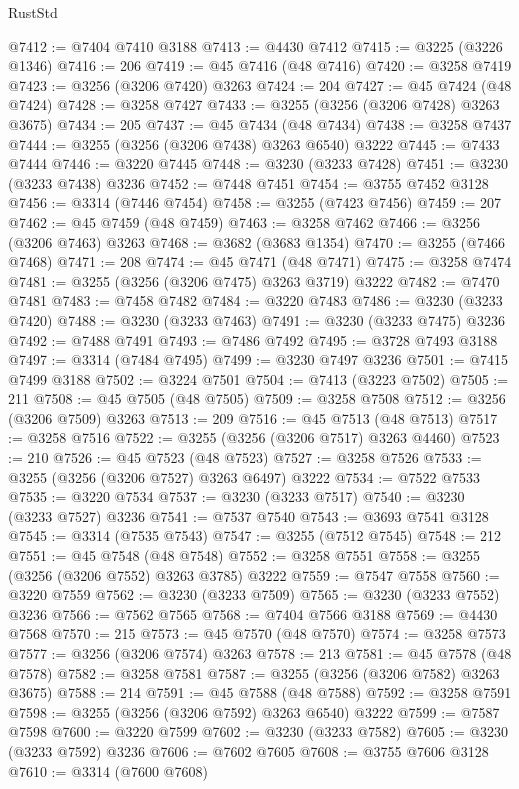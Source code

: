 \begin{lexlean}{RustStd}
\begin{coremodule}
{\begin{coremodule}
{{{{{{{{{{{{{{{{{{{{{{{{{{{{{{{{{{{{{@7412 := @7404 @7410 @3188
@7413 := @4430 @7412
@7415 := @3225 (@3226 @1346)
@7416 := 206
@7419 := @45 @7416 (@48 @7416)
@7420 := @3258 @7419
@7423 := @3256 (@3206 @7420) @3263
@7424 := 204
@7427 := @45 @7424 (@48 @7424)
@7428 := @3258 @7427
@7433 := @3255 (@3256 (@3206 @7428) @3263 @3675)
@7434 := 205
@7437 := @45 @7434 (@48 @7434)
@7438 := @3258 @7437
@7444 := @3255 (@3256 (@3206 @7438) @3263 @6540) @3222
@7445 := @7433 @7444
@7446 := @3220 @7445
@7448 := @3230 (@3233 @7428)
@7451 := @3230 (@3233 @7438) @3236
@7452 := @7448 @7451
@7454 := @3755 @7452 @3128
@7456 := @3314 (@7446 @7454)
@7458 := @3255 (@7423 @7456)
@7459 := 207
@7462 := @45 @7459 (@48 @7459)
@7463 := @3258 @7462
@7466 := @3256 (@3206 @7463) @3263
@7468 := @3682 (@3683 @1354)
@7470 := @3255 (@7466 @7468)
@7471 := 208
@7474 := @45 @7471 (@48 @7471)
@7475 := @3258 @7474
@7481 := @3255 (@3256 (@3206 @7475) @3263 @3719) @3222
@7482 := @7470 @7481
@7483 := @7458 @7482
@7484 := @3220 @7483
@7486 := @3230 (@3233 @7420)
@7488 := @3230 (@3233 @7463)
@7491 := @3230 (@3233 @7475) @3236
@7492 := @7488 @7491
@7493 := @7486 @7492
@7495 := @3728 @7493 @3188
@7497 := @3314 (@7484 @7495)
@7499 := @3230 @7497 @3236
@7501 := @7415 @7499 @3188
@7502 := @3224 @7501
@7504 := @7413 (@3223 @7502)
@7505 := 211
@7508 := @45 @7505 (@48 @7505)
@7509 := @3258 @7508
@7512 := @3256 (@3206 @7509) @3263
@7513 := 209
@7516 := @45 @7513 (@48 @7513)
@7517 := @3258 @7516
@7522 := @3255 (@3256 (@3206 @7517) @3263 @4460)
@7523 := 210
@7526 := @45 @7523 (@48 @7523)
@7527 := @3258 @7526
@7533 := @3255 (@3256 (@3206 @7527) @3263 @6497) @3222
@7534 := @7522 @7533
@7535 := @3220 @7534
@7537 := @3230 (@3233 @7517)
@7540 := @3230 (@3233 @7527) @3236
@7541 := @7537 @7540
@7543 := @3693 @7541 @3128
@7545 := @3314 (@7535 @7543)
@7547 := @3255 (@7512 @7545)
@7548 := 212
@7551 := @45 @7548 (@48 @7548)
@7552 := @3258 @7551
@7558 := @3255 (@3256 (@3206 @7552) @3263 @3785) @3222
@7559 := @7547 @7558
@7560 := @3220 @7559
@7562 := @3230 (@3233 @7509)
@7565 := @3230 (@3233 @7552) @3236
@7566 := @7562 @7565
@7568 := @7404 @7566 @3188
@7569 := @4430 @7568
@7570 := 215
@7573 := @45 @7570 (@48 @7570)
@7574 := @3258 @7573
@7577 := @3256 (@3206 @7574) @3263
@7578 := 213
@7581 := @45 @7578 (@48 @7578)
@7582 := @3258 @7581
@7587 := @3255 (@3256 (@3206 @7582) @3263 @3675)
@7588 := 214
@7591 := @45 @7588 (@48 @7588)
@7592 := @3258 @7591
@7598 := @3255 (@3256 (@3206 @7592) @3263 @6540) @3222
@7599 := @7587 @7598
@7600 := @3220 @7599
@7602 := @3230 (@3233 @7582)
@7605 := @3230 (@3233 @7592) @3236
@7606 := @7602 @7605
@7608 := @3755 @7606 @3128
@7610 := @3314 (@7600 @7608)
}}}}}}}}}}}}}}}}}}}}}}}}}}}}}}}}}}}}}
\end{coremodule}}
\end{coremodule}
\end{lexlean}
